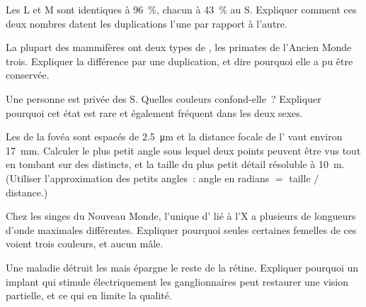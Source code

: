 \begin{exercise}[$\star\star$]\label{exo:g11:the-eye:10}
Les  L et M sont identiques à 96~\%, chacun à 43~\% au  S.
Expliquer comment ces deux nombres datent les duplications l'une par
rapport à l'autre.
\end{exercise}

\begin{exercise}[$\star\star$]\label{exo:g11:the-eye:11}
La plupart des mammifères ont deux types de , les primates de
l'Ancien Monde trois. Expliquer la différence par une duplication, et
dire pourquoi elle a pu être conservée.
\end{exercise}

\begin{exercise}[$\star\star\star$]\label{exo:g11:the-eye:12}
Une personne est privée des  S. Quelles couleurs confond-elle~?
Expliquer pourquoi cet état est rare et également fréquent dans les
deux sexes.
\end{exercise}

\begin{exercise}[$\star\star\star$]\label{exo:g11:the-eye:13}
Les  de la fovéa sont espacés de \qty{2.5}{\micro m} et la
distance focale de l' vaut environ \qty{17}{mm}. Calculer le plus
petit angle sous lequel deux points peuvent être vus tout en tombant
sur des  distincts, et la taille du plus petit détail résoluble à
\qty{10}{m}. (Utiliser l'approximation des petits angles~: angle en
radians $=$ taille $/$ distance.)
\end{exercise}

\begin{exercise}[$\star\star\star$]\label{exo:g11:the-eye:14}
Chez les singes du Nouveau Monde, l'unique  d' lié à l'X a
plusieurs  de longueurs d'onde maximales différentes. Expliquer
pourquoi seules certaines femelles de ces  voient trois
couleurs, et aucun mâle.
\end{exercise}

\begin{exercise}[$\star\star\star$]\label{exo:g11:the-eye:15}
Une maladie détruit les  mais épargne le reste de la
rétine. Expliquer pourquoi un implant qui stimule électriquement les
 ganglionnaires peut restaurer une vision partielle, et ce qui
en limite la qualité.
\end{exercise}

